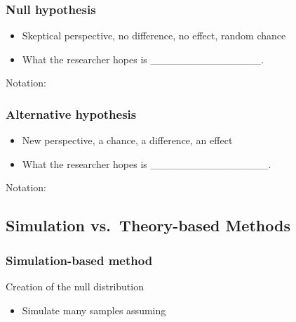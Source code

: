 \documentclass[
]{report}
\providecommand{\tightlist}{%
  \setlength{\itemsep}{0pt}\setlength{\parskip}{0pt}}
\begin{document}

\subsubsection*{Null hypothesis}\label{null-hypothesis}

\begin{itemize}
\item
  Skeptical perspective, no difference, no effect, random chance
\item
  What the researcher hopes is \_\_\_\_\_\_\_\_\_\_\_\_\_\_\_.
\end{itemize}

Notation:

\vspace{0.2in}

\subsubsection*{Alternative hypothesis}\label{alternative-hypothesis}

\begin{itemize}
\item
  New perspective, a chance, a difference, an effect
\item
  What the researcher hopes is \_\_\_\_\_\_\_\_\_\_\_\_\_\_\_\_.
\end{itemize}

Notation:

\vspace{0.2in}

\subsection*{Simulation vs.~Theory-based Methods}\label{simulation-vs.-theory-based-methods}

\subsubsection*{Simulation-based method}\label{simulation-based-method}


Creation of the null distribution

\begin{itemize}
\tightlist
\item
  Simulate many samples assuming
\end{itemize}
\end{document}
